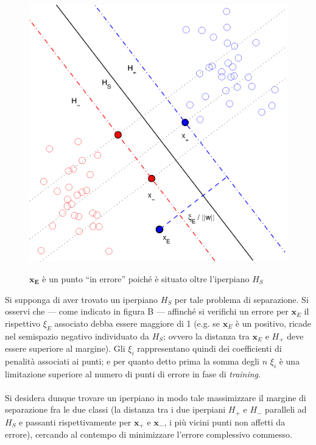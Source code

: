\begin{figure}[H] %
 	\centering	
	
	\fboxsep=0mm%
	\fboxrule=1mm%

	 {
		\includegraphics[scale=0.9]{img/FiguraE_soft.eps}		
	}	
	\caption{$\boldsymbol{x_E}$ è un punto ``in errore'' poiché è situato oltre l'iperpiano $H_S$}
\end{figure}

Si supponga di aver trovato un iperpiano $H_S$ per tale problema di separazione.
Si osservi che --- come indicato in figura B --- affinché si verifichi un errore per $\boldsymbol{x}_E$ il rispettivo $\xi_E$ associato debba essere maggiore di 1 (e.g. se $\boldsymbol{x}_E$ è un positivo, ricade nel semispazio negativo individuato da $H_S$; ovvero la distanza tra $\boldsymbol{x}_E$ e $H_+$ deve essere superiore al margine). 
Gli $\xi_i$ rappresentano quindi dei coefficienti di penalità associati ai punti; e per quanto detto prima la somma degli $n$ $\xi_i$ è una limitazione superiore al numero di punti di errore in fase di \textit{training}.

\paragraph{}
Si desidera dunque trovare un iperpiano in modo tale massimizzare il margine di separazione fra le due classi (la distanza tra i due iperpiani $H_+$ e $H_-$ paralleli ad $H_S$ e passanti rispettivamente per $\boldsymbol{x_+}$ e $\boldsymbol{x_-}$, i più vicini punti non affetti da errore), cercando al contempo di minimizzare l'errore complessivo commesso.

